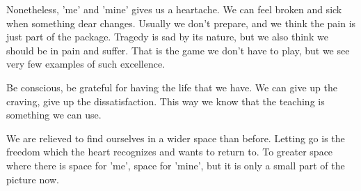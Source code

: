 Nonetheless, 'me' and 'mine' gives us a heartache. We can feel broken
and sick when something dear changes. Usually we don't prepare, and we
think the pain is just part of the package. Tragedy is sad by its
nature, but we also think we should be in pain and suffer. That is the
game we don't have to play, but we see very few examples of such
excellence.

Be conscious, be grateful for having the life that we have. We can give
up the craving, give up the dissatisfaction. This way we know that the
teaching is something we can use.

We are relieved to find ourselves in a wider space than before. Letting
go is the freedom which the heart recognizes and wants to return to. To
greater space where there is space for 'me', space for 'mine', but it is
only a small part of the picture now.
